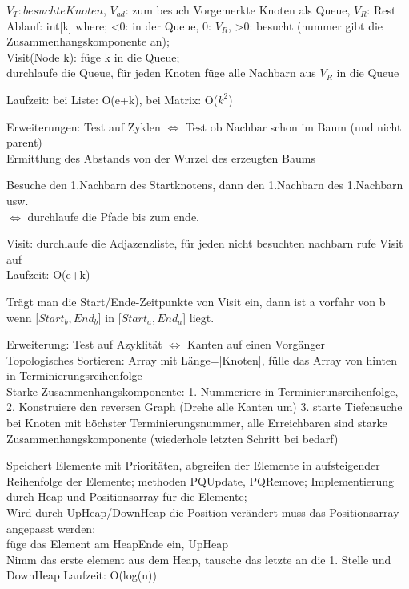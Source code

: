 $V_T: besuchte Knoten$, $V_{ad}$: zum besuch Vorgemerkte Knoten als Queue, $V_R$: Rest\\

Ablauf: int[k] where; <0: in der Queue, 0: $V_R$, >0: besucht (nummer gibt die Zusammenhangskomponente an);\\
Visit(Node k): füge k in die Queue;\\
durchlaufe die Queue, für jeden Knoten füge alle Nachbarn aus $V_R$ in die Queue

Laufzeit: bei Liste: O(e+k), bei Matrix: O($k^2$)

Erweiterungen: Test auf Zyklen $\Leftrightarrow$ Test ob Nachbar schon im Baum (und nicht parent)\\
Ermittlung des Abstands von der Wurzel des erzeugten Baums

Besuche den 1.Nachbarn des Startknotens, dann den 1.Nachbarn des 1.Nachbarn usw.\\
$\Leftrightarrow$ durchlaufe die Pfade bis zum ende.

Visit: durchlaufe die Adjazenzliste, für jeden nicht besuchten nachbarn rufe Visit auf\\
Laufzeit: O(e+k)

Trägt man die Start/Ende-Zeitpunkte von Visit ein, dann ist a vorfahr von b wenn [$Start_b,End_b$] in [$Start_a,End_a$] liegt. 

Erweiterung: Test auf Azyklität $\Leftrightarrow$ Kanten auf einen Vorgänger\\
Topologisches Sortieren: Array mit Länge=|Knoten|, fülle das Array von hinten in Terminierungsreihenfolge\\
Starke Zusammenhangskomponente: 1. Nummeriere in Terminierunsreihenfolge, 2. Konstruiere den reversen Graph (Drehe alle Kanten um) 3. starte Tiefensuche bei Knoten mit höchster Terminierungsnummer, alle Erreichbaren sind starke Zusammenhangskomponente (wiederhole letzten Schritt bei bedarf)

Speichert Elemente mit Prioritäten, abgreifen der Elemente in aufsteigender Reihenfolge der Elemente; methoden PQUpdate, PQRemove;
Implementierung durch Heap und Positionsarray für die Elemente;\\
Wird durch UpHeap/DownHeap die Position verändert muss das Positionsarray angepasst werden;\\
 füge das Element am HeapEnde ein, UpHeap \\
 Nimm das erste element aus dem Heap, tausche das letzte an die 1. Stelle und DownHeap
Laufzeit: O(log(n))

